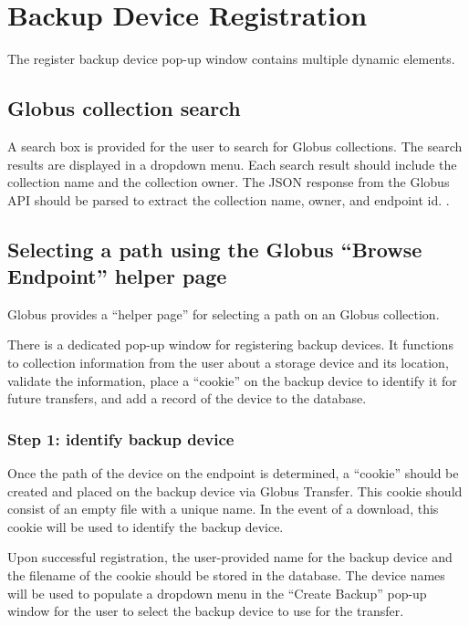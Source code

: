 
\section{Backup Device Registration}

The register backup device pop-up window contains multiple dynamic elements.

\subsection{Globus collection search}

A search box is provided for the user to search for Globus collections. The search
results are displayed in a dropdown menu. Each search result should include the
collection name and the collection owner. The JSON response from the Globus
API should be parsed to extract the collection name, owner, and endpoint
id. .

\subsection{Selecting a path using the Globus ``Browse Endpoint'' helper page}

Globus provides a ``helper page'' for selecting a path on an Globus collection.

There is a dedicated pop-up window for registering backup devices. It functions
to collection information from the user about a storage device and its location,
validate the information, place a ``cookie'' on the backup device to identify it 
for future transfers, and add a record of the device to the database.

\subsubsection{Step 1: identify backup device}

Once the path of the device on the endpoint is determined, a ``cookie'' 
should be created and placed on the backup device via Globus Transfer. This cookie 
should consist of an empty file with a unique name. In the event of a download, this 
cookie will be used to identify the backup device.

Upon successful registration, the user-provided name for the backup device and the 
filename of the cookie should be stored in the database. The device names will be 
used to populate a dropdown menu in the ``Create Backup'' pop-up window for the
user to select the backup device to use for the transfer.

